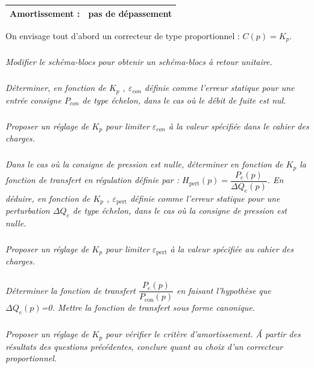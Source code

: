 \documentclass[10pt,fleqn]{article} %
\begin{document}
\begin{multicols}{2}
\begin{center}
\begin{tabular}{|l|p{5cm}|}
Amortissement :&	pas de dépassement \\ \hline
\end{tabular}
\end{center}


On envisage tout d’abord un correcteur de type proportionnel : $C(p)=K_p$. 


\subparagraph{}
\textit{Modifier le schéma-blocs pour obtenir un schéma-blocs à retour unitaire.}

\subparagraph{}
\textit{Déterminer, en fonction de $K_p$ , $\varepsilon_{con}$ définie comme l’erreur statique pour une entrée consigne $P_{con}$ de type échelon, dans le cas où le débit de fuite est nul.}

\subparagraph{}
\textit{Proposer un réglage de $K_p$ pour limiter $\varepsilon_{con}$ à la valeur spécifiée dans le  cahier des charges.}

\subparagraph{}
\textit{Dans le cas où la consigne de pression est nulle,  déterminer en fonction de $K_p$ la fonction de transfert en régulation définie par :
$H_{\text{pert}} (p)=\dfrac{P_e (p)}{\Delta Q_e (p)}$.
En déduire, en fonction de $K_p$ , $\varepsilon_{\text{pert}}$ définie comme l’erreur statique pour une perturbation $\Delta Q_e$ de type échelon, dans le cas où la consigne de pression est nulle.}

\subparagraph{}
\textit{Proposer un réglage de $K_p$ pour limiter $\varepsilon_{\text{pert}}$ à la valeur spécifiée au cahier des charges.}



\subparagraph{}
\textit{Déterminer la fonction de transfert $\dfrac{P_e(p)}{P_{\text{con}}(p)}$ en faisant l'hypothèse que $\Delta Q_e(p)$=0. Mettre la fonction de transfert sous forme canonique.}

\subparagraph{}
\textit{Proposer un réglage de $K_p$ pour vérifier le critère d’amortissement. \'A partir des résultats des questions précédentes, conclure quant au choix d’un correcteur proportionnel.}


\end{multicols}
\end{document}
